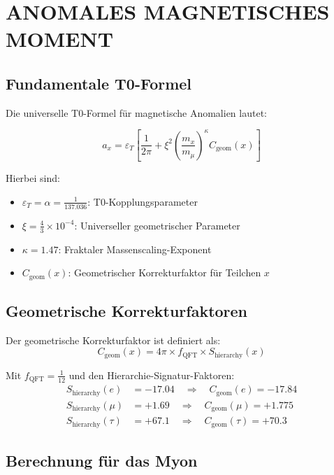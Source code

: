 \documentclass[12pt,a4paper]{article}
\begin{document}
\section{ANOMALES MAGNETISCHES MOMENT}

\subsection{Fundamentale T0-Formel}

Die universelle T0-Formel für magnetische Anomalien lautet:

\begin{equation}
	\boxed{a_x = \varepsilon_T \left[ \frac{1}{2\pi} + \xi^2 \left(\frac{m_x}{m_\mu}\right)^\kappa C_{\text{geom}}(x) \right]}
\end{equation}

Hierbei sind:
\begin{itemize}
	\item $\varepsilon_T = \alpha = \frac{1}{137.036}$: T0-Kopplungsparameter
	\item $\xi = \frac{4}{3} \times 10^{-4}$: Universeller geometrischer Parameter
	\item $\kappa = 1.47$: Fraktaler Massenscaling-Exponent
	\item $C_{\text{geom}}(x)$: Geometrischer Korrekturfaktor für Teilchen $x$
\end{itemize}

\subsection{Geometrische Korrekturfaktoren}

Der geometrische Korrekturfaktor ist definiert als:
\begin{equation}
	C_{\text{geom}}(x) = 4\pi \times f_{\text{QFT}} \times S_{\text{hierarchy}}(x)
\end{equation}

Mit $f_{\text{QFT}} = \frac{1}{12}$ und den Hierarchie-Signatur-Faktoren:
\begin{align}
	S_{\text{hierarchy}}(e) &= -17.04 \quad \Rightarrow \quad C_{\text{geom}}(e) = -17.84\\
	S_{\text{hierarchy}}(\mu) &= +1.69 \quad \Rightarrow \quad C_{\text{geom}}(\mu) = +1.775\\
	S_{\text{hierarchy}}(\tau) &= +67.1 \quad \Rightarrow \quad C_{\text{geom}}(\tau) = +70.3
\end{align}

\subsection{Berechnung für das Myon}
\end{document}
